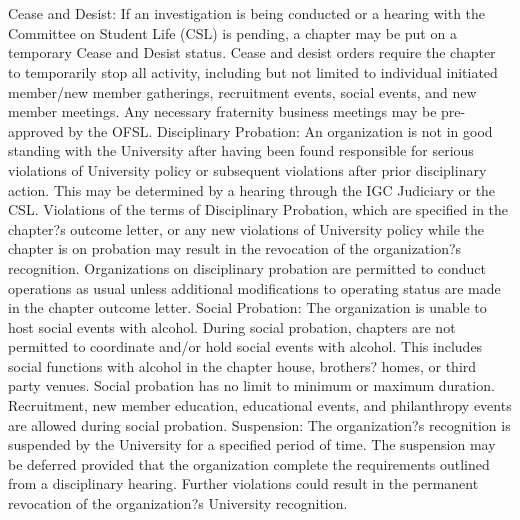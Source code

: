 \documentclass[12pt]{amsart}
\title{}
\author{}
\date{} %
\begin{document}
\maketitle
\tableofcontents

\section{}

Cease and Desist: If an investigation is being conducted or a hearing with the Committee on Student Life (CSL) is pending, a chapter may be put on a temporary Cease and Desist status. Cease and desist orders require the chapter to temporarily stop all activity, including but not limited to individual initiated member/new member gatherings, recruitment events, social events, and new member meetings. Any necessary fraternity business meetings may be pre-approved by the OFSL.
Disciplinary Probation: An organization is not in good standing with the University after having been found responsible for serious violations of University policy or subsequent violations after prior disciplinary action. This may be determined by a hearing through the IGC Judiciary or the CSL. Violations of the terms of Disciplinary Probation, which are specified in the chapter?s outcome letter, or any new violations of University policy while the chapter is on probation may result in the revocation of the organization?s recognition.  Organizations on disciplinary probation are permitted to conduct operations as usual unless additional modifications to operating status are made in the chapter outcome letter.
Social Probation: The organization is unable to host social events with alcohol. During social probation, chapters are not permitted to coordinate and/or hold social events with alcohol. This includes social functions with alcohol in the chapter house, brothers? homes, or third party venues. Social probation has no limit to minimum or maximum duration. Recruitment, new member education, educational events, and philanthropy events are allowed during social probation.
Suspension: The organization?s recognition is suspended by the University for a specified period of time. The suspension may be deferred provided that the organization complete the requirements outlined from a disciplinary hearing. Further violations could result in the permanent revocation of the organization?s University recognition.
\subsection{}
\end{document}
